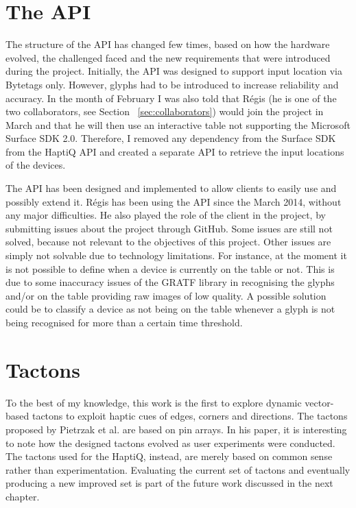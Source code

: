 \section{The API}

The structure of the API has changed few times, based on how the hardware evolved, the challenged faced and the new requirements that were introduced during the project. 
Initially, the API was designed to support input location via Bytetags only. However, glyphs had to be introduced to increase reliability and accuracy. In the month of February I was also told that Régis (he is one of the two collaborators, see Section ~\ref{sec:collaborators}) would join the project in March and that he will then use an interactive table not supporting the Microsoft Surface SDK 2.0. Therefore, I removed any dependency from the Surface SDK from the HaptiQ API and created a separate API to retrieve the input locations of the devices. 

The API has been designed and implemented to allow clients to easily use and possibly extend it. Régis has been using the API since the  March 2014, without any major difficulties. He also played the role of the client in the project, by submitting issues about the project through GitHub. Some issues are still not solved, because not relevant to the objectives of this project. Other issues are simply not solvable due to technology limitations. For instance, at the moment it is not possible to define when a device is currently on the table or not. This is due to some inaccuracy issues of the GRATF library in recognising the glyphs and/or on the table providing raw images of low quality. A possible solution could be to classify a device as not being on the table whenever a glyph is not being recognised for more than a certain time threshold. 


\section{Tactons}

To the best of my knowledge, this work is the first to explore dynamic vector-based tactons to exploit haptic cues of edges, corners and directions. The tactons proposed by Pietrzak et al. \cite{pietrzak2009creating} are based on pin arrays. In his paper, it is interesting to note how the designed tactons evolved as user experiments were conducted. The tactons used for the HaptiQ, instead, are merely based on common sense rather than experimentation. Evaluating the current set of tactons and eventually producing a new improved set is part of the future work discussed in the next chapter.

